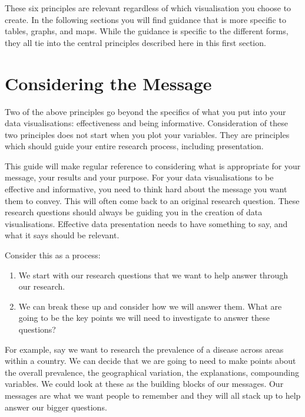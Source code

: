 \documentclass[
]{book}
\begin{document}
These six principles are relevant regardless of which visualisation you choose to create. In the following sections you will find guidance that is more specific to tables, graphs, and maps. While the guidance is specific to the different forms, they all tie into the central principles described here in this first section.

\hypertarget{CTM}{%
\chapter{Considering the Message}\label{CTM}}

Two of the above principles go beyond the specifics of what you put into your data visualisations: effectiveness and being informative. Consideration of these two principles does not start when you plot your variables. They are principles which should guide your entire research process, including presentation.

This guide will make regular reference to considering what is appropriate for your message, your results and your purpose. For your data visualisations to be effective and informative, you need to think hard about the message you want them to convey. This will often come back to an original research question. These research questions should always be guiding you in the creation of data visualisations. Effective data presentation needs to have something to say, and what it says should be relevant.

Consider this as a process:

\begin{enumerate}
\def\labelenumi{\arabic{enumi}.}
\item
  We start with our research questions that we want to help answer through our research.
\item
  We can break these up and consider how we will answer them. What are going to be the key points we will need to investigate to answer these questions?
\end{enumerate}

For example, say we want to research the prevalence of a disease across areas within a country. We can decide that we are going to need to make points about the overall prevalence, the geographical variation, the explanations, compounding variables. We could look at these as the building blocks of our messages. Our messages are what we want people to remember and they will all stack up to help answer our bigger questions.
\end{document}
